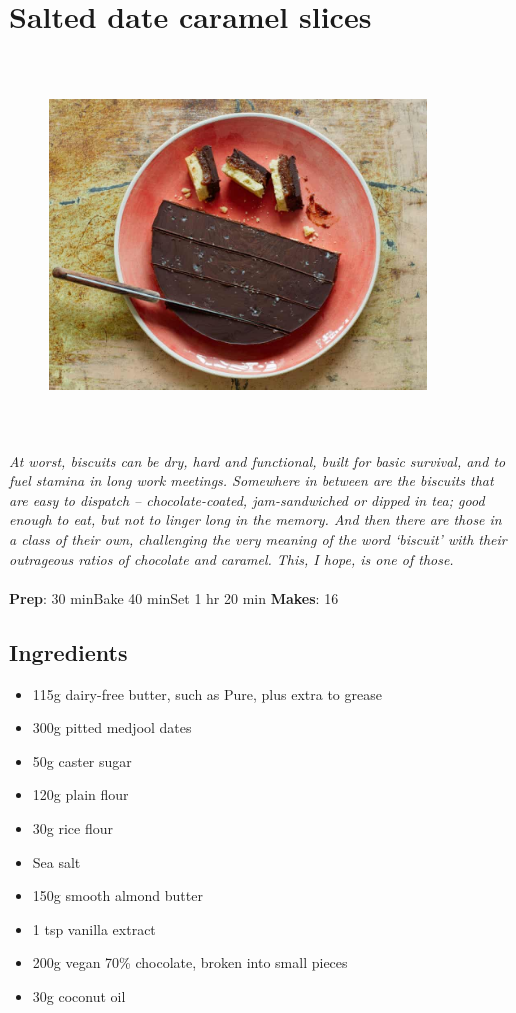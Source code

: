 \documentclass{book}
\begin{document}
\section{Salted date caramel slices}
\begin{figure}
\centering\includegraphics[width=10cm,height=10cm,keepaspectratio]{Recipe_Pictures/Salted_date_caramel_slices.png}
\end{figure}
\emph{At worst, biscuits can be dry, hard and functional, built for basic survival, and to fuel stamina in long work meetings. Somewhere in between are the biscuits that are easy to dispatch – chocolate-coated, jam-sandwiched or dipped in tea; good enough to eat, but not to linger long in the memory. And then there are those in a class of their own, challenging the very meaning of the word ‘biscuit’ with their outrageous ratios of chocolate and caramel. This, I hope, is one of those.}\\\\ 
\textbf{Prep}: 30 minBake 40 minSet 1 hr 20 min
\textbf{Makes}: 16
\subsection*{Ingredients}
\begin{itemize}
\item 115g dairy-free butter, such as Pure, plus extra to grease
\item 300g pitted medjool dates 
\item 50g caster sugar 
\item 120g plain flour 
\item 30g rice flour 
\item Sea salt 
\item 150g smooth almond butter
\item 1 tsp vanilla extract 
\item 200g vegan 70\% chocolate, broken into small pieces 
\item 30g coconut oil
\end{itemize}
\end{document}
